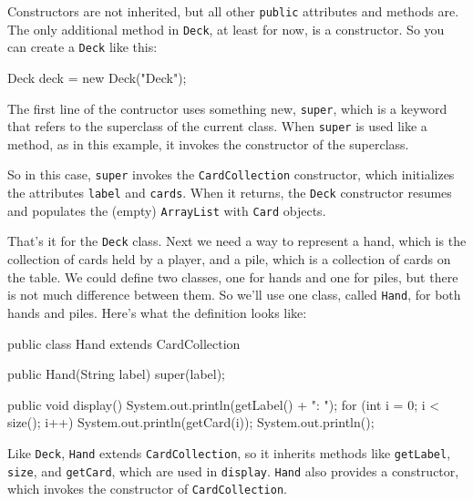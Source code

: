 \documentclass[12pt]{book}
\theoremstyle{exercise}
\newcommand{\java}[1]{\verb"#1"}
\begin{document}

Constructors are not inherited, but all other \java{public} attributes and methods are.
The only additional method in \java{Deck}, at least for now, is a constructor.
So you can create a \java{Deck} like this:

\begin{code}
    Deck deck = new Deck("Deck");
\end{code}

The first line of the contructor uses something new, \java{super}, which is a keyword that refers to the superclass of the current class.
When \java{super} is used like a method, as in this example, it invokes the constructor of the superclass.


So in this case, \java{super} invokes the \java{CardCollection} constructor, which initializes the attributes \java{label} and \java{cards}.
When it returns, the \java{Deck} constructor resumes and populates the (empty) \java{ArrayList} with \java{Card} objects.

That's it for the \java{Deck} class.
Next we need a way to represent a hand, which is the collection of cards held by a player, and a pile, which is a collection of cards on the table.
We could define two classes, one for hands and one for piles, but there is not much difference between them.
So we'll use one class, called \java{Hand}, for both hands and piles.
Here's what the definition looks like:

\begin{code}
public class Hand extends CardCollection {

    public Hand(String label) {
        super(label);
    }

    public void display() {
        System.out.println(getLabel() + ": ");
        for (int i = 0; i < size(); i++) {
            System.out.println(getCard(i));
        }
        System.out.println();
    }
}
\end{code}

Like \java{Deck}, \java{Hand} extends \java{CardCollection}, so it inherits methods like \java{getLabel}, \java{size}, and \java{getCard}, which are used in \java{display}.
\java{Hand} also provides a constructor, which invokes the constructor of \java{CardCollection}.
\end{document}
